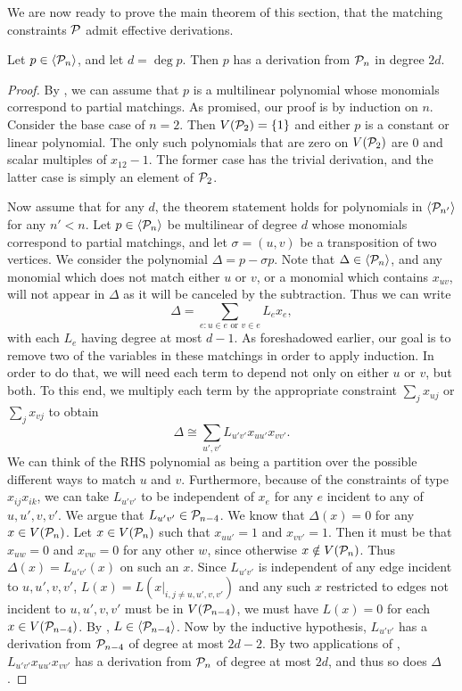 We are now ready to prove the main theorem of this section, that the matching constraints $\mathcal P$ admit effective derivations. 
\begin{theorem}\label{thm:matching-effective}
Let $p \in \langle \mathcal P_n \rangle$, and let $d = \deg p$. Then $p$ has a derivation from $\mathcal P_n$ in degree $2d$. 
\end{theorem}
\begin{proof}
By , we can assume that $p$ is a multilinear polynomial whose monomials correspond to partial matchings.
As promised, our proof is by induction on $n$. Consider the base case of $n = 2$. 
Then $V(\mathcal P_2) = \{1\}$ and either $p$ is a constant or linear polynomial.
The only such polynomials that are zero on $V(\mathcal P_2)$ are $0$ and scalar multiples of $x_{12} - 1$. 
The former case has the trivial derivation, and the latter case is simply an element of $\mathcal P_2$. 

Now assume that for any $d$, the theorem statement holds for polynomials in $\langle \mathcal P_{n'} \rangle$ for any $n' < n$. 
Let $p \in \langle \mathcal P_n \rangle$ be multilinear of degree $d$ whose monomials correspond to partial matchings, and let $\sigma = (u,v)$ be a transposition of two vertices.
We consider the polynomial $\Delta = p - \sigma p$. Note that $\Delta \in \langle \mathcal P_n \rangle$, and any monomial which does not match either $u$ or $v$, or a monomial which contains $x_{uv}$, will not appear in $\Delta$ as it will be canceled by the subtraction.
Thus we can write
\[\Delta = \sum_{e: u \in e \text{ or } v \in e} L_e x_e,\]
with each $L_e$ having degree at most $d-1$. As foreshadowed earlier, our goal is to remove two of the variables in these matchings in order to apply induction. In order to do that, we will need each term to depend not only on either $u$ or $v$, but both. To this end, we multiply each term by the appropriate constraint $\sum_j x_{uj}$ or $\sum_j x_{vj}$ to obtain
\[\Delta \cong \sum_{u',v'} L_{u'v'} x_{uu'}x_{vv'}.\]
We can think of the RHS polynomial as being a partition over the possible different ways to match $u$ and $v$.
Furthermore, because of the constraints of type $x_{ij}x_{ik}$, we can take $L_{u'v'}$ to be independent of $x_e$ for any $e$ incident to any of $u,u',v,v'$. 
We argue that $L_{u'v'} \in \mathcal P_{n-4}$. We know that $\Delta(x) = 0$ for any $x \in V(\mathcal P_n)$. Let $x \in V(\mathcal P_n)$ such that $x_{uu'} = 1$ and $x_{vv'} = 1$. 
Then it must be that $x_{uw} = 0$ and $x_{vw} = 0$ for any other $w$, since otherwise $x \notin V(\mathcal P_n)$.
Thus $\Delta(x) = L_{u'v'}(x)$ on such an $x$. Since $L_{u'v'}$ is independent of any edge incident to $u,u',v,v'$, $L(x) = L(x|_{i,j \neq u,u',v,v'})$ and any such $x$ restricted to edges not incident to $u,u',v,v'$ must be in $V(\mathcal P_{n-4})$, we must have $L(x) = 0$ for each $x \in V(\mathcal P_{n-4})$. By , $L \in \langle \mathcal P_{n-4} \rangle$. Now by the inductive hypothesis, $L_{u'v'}$ has a derivation from $\mathcal P_{n-4}$ of degree at most $2d-2$. By two applications of , $L_{u'v'}x_{uu'}x_{vv'}$ has a derivation from $\mathcal P_n$ of degree at most $2d$, and thus so does $\Delta$.


\end{proof}
